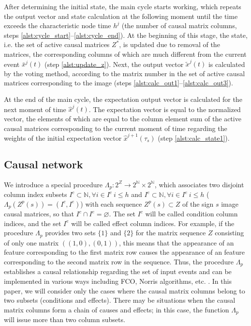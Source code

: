 \documentclass[review]{elsarticle}
\begin{document}
After determining the initial state, the main cycle starts working, which repeats the output vector and state calculation at the following moment until the time exceeds the characteristic node time $h^j$ (the number of causal matrix columns, steps \ref{alst:cycle_start}--\ref{alst:cycle_end}). At the beginning of this stage, the state, i.e. the set of active causal matrices $Z^*$, is updated due to removal of the matrices, the corresponding columns of which are much different from the current event $\bar x^j(t)$ (step \ref{alst:update_z}). Next, the output vector $\tilde x^j(t)$ is calculated by the voting method, according to the matrix number in the set of active causal matrices corresponding to the image (steps \ref{alst:calc_out1}--\ref{alst:calc_out3}).

At the end of the main cycle, the expectation output vector is calculated for the next moment of time $\hat x^j(t)$. The expectation vector is equal to the normalized vector, the elements of which are equal to the column element sum of the active causal matrices corresponding to the current moment of time regarding the weights of the initial expectation vector $\hat x^{j+1}(\tau_s)$ (step \ref{alst:calc_state1}).

\subsection{Causal network}

We introduce a special procedure $\Lambda_p: 2^Z\rightarrow 2^{\mathbb N}\times 2^{\mathbb N}$, which associates two disjoint column index subsets $I^c\subset\mathbb N, \forall i\in I^c\ i\leq h$ and $I^e\subset\mathbb N, \forall i\in I^e\ i\leq h$ ($\Lambda_p(Z^p(s))=(I^c,I^e)$) with each sequence $Z^p(s)\subset Z$ of the sign $s$ image causal matrices, so that $I^c\cap I^e=\varnothing$. The set $I^c$ will be called condition column indices, and the set $I^e$ will be called effect column indices. For example, if the procedure $\Lambda_p$ provides two sets $\{1\}$ and $\{2\}$ for the matrix sequence $Z$ consisting of only one matrix $((1, 0), (0, 1))$, this means that the appearance of an feature corresponding to the first matrix row causes the appearance of an feature corresponding to the second matrix row in the sequence. Thus, the procedure $\Lambda_p$ establishes a causal relationship regarding the set of input events and can be implemented in various ways including FCO, Norris algorithms, etc. \cite{Kuznetsov2001,Kuznetsov1996}. In this paper, we will consider only the cases where the causal matrix columns belong to two subsets (conditions and effects). There may be situations when the causal matrix columns form a chain of causes and effects; in this case, the function $\Lambda_p$ will issue more than two column subsets.
\end{document}
